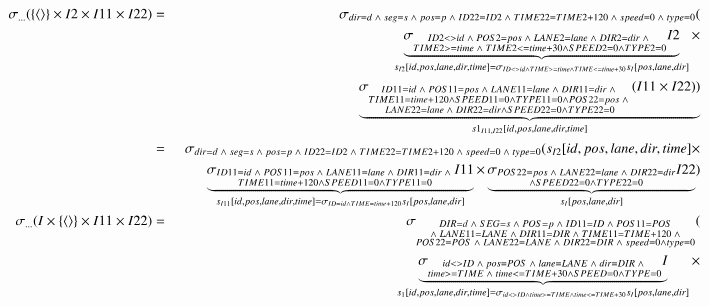 \begin{eqnarray*} 
\sigma_{\dots}(  \{\tuple{} \} \times I2 \times I11 \times I22) &=& 
 \sigma_{dir = d \;\wedge\; seg = s \;\wedge\; pos = p \;\wedge\; ID22 = ID2 \;\wedge\; TIME22 = TIME2 + 120 \;\wedge\; speed = 0 \;\wedge\; type = 0 }( \\
&&\qquad \underbrace{\sigma_{\substack {ID2 <> id \;\wedge\; POS2 = pos \;\wedge\; LANE2 = lane \; \wedge\; DIR2 = dir \;\wedge \; \\TIME2 >= time \;\wedge\; TIME2 <= time + 30 \wedge SPEED2 = 0 \wedge TYPE2 = 0 }}I2 }_{s_{I2}[id, pos, lane, dir, time] = \sigma_{ID<>id \wedge TIME>=time \wedge TIME <= time +30} s_I[pos, lane, dir]}\times \\
&&\qquad \underbrace{\sigma_{\substack {ID11 = id \;\wedge\; POS11 = pos \;\wedge\;  LANE11 = lane \;\wedge\; DIR11= dir \;\wedge\; \\ TIME11 = time + 120 \wedge  SPEED11 = 0 \wedge TYPE11 = 0 \wedge POS22 = pos \;\wedge\; \\ LANE22 = lane \;\wedge\; DIR22 = dir \wedge SPEED22 = 0 \wedge TYPE22 =0}} (I11 \times I22) )}_{s1_{I11,I22}[id, pos, lane, dir, time]}\\ 
%
&=&  \sigma_{dir = d \;\wedge\; seg = s \;\wedge\; pos = p \;\wedge\; ID22 = ID2 \;\wedge\; TIME22 = TIME2 + 120 \;\wedge\; speed = 0 \;\wedge\; type = 0 }( s_{I2}[id, pos, lane, dir, time]\times \\
&&\qquad \underbrace{\sigma_{\substack {ID11 = id \;\wedge\; POS11 = pos \;\wedge\;  LANE11 = lane \;\wedge\; DIR11= dir \;\wedge\; \\ TIME11 = time + 120 \wedge  SPEED11 = 0 \wedge TYPE11 = 0}} I11}_{s_{I11}[id, pos, lane, dir, time] = \sigma_{ID = id \wedge TIME = time+120} s_I[pos, lane, dir]} \times 
\underbrace {\sigma_{\substack{ POS22 = pos \;\wedge\; LANE22 = lane \;\wedge\; DIR22 = dir \\ \wedge SPEED22 = 0 \wedge TYPE22 =0}} I22}_{s_{I}[pos, lane, dir]} )\\ 
\sigma_{\dots}(I \times \{\tuple{} \} \times I11 \times I22) &=&
\sigma_{\substack{DIR = d \;\wedge\; SEG = s \;\wedge\; POS = p \;\wedge\; ID11 = ID \;\wedge\; POS11 = POS \\\;\wedge\;  LANE11 = LANE \;\wedge\; DIR11=DIR \;\wedge\; TIME11 = TIME + 120 \;\wedge\; \\POS22 = POS \;\wedge\;  LANE22 = LANE \;\wedge\; DIR22 = DIR \;\wedge\; speed = 0 \wedge type = 0 }}(\\
&& \underbrace{\sigma_{\substack{id <> ID \;\wedge\; pos = POS \;\wedge\; lane = LANE \;\wedge\; dir = DIR \;\wedge\; \\time >= TIME \;\wedge\; time <= TIME + 30 \wedge SPEED = 0 \wedge TYPE = 0 }} I}_{s_1[id, pos, lane, dir, time] = \sigma_{id <> ID \wedge time >= TIME \wedge time <= TIME+30} s_{I}[pos, lane, dir]} \times 

\end{eqnarray*}
